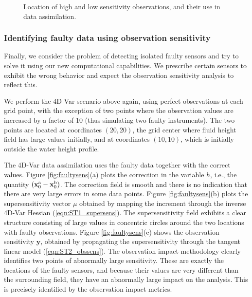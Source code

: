 \documentclass[final,sort&compress]{elsarticle}
\newcommand{\xb}{ \mathbf{x}^{\rm b} }
\newcommand{\xa}{ \mathbf{x}^{\rm a} }
\newcommand{\y}{ \mathbf{y} }
\begin{document}
\begin{figure}
\begin{center}
\setcounter{subfigure}{0}
\caption{Location of high and low sensitivity observations, and their use in data assimilation.}
\label{fig:OI_mask}
\end{center}
\end{figure}






\subsubsection{Identifying faulty data using observation sensitivity}

Finally, we consider the problem of detecting isolated faulty sensors and try to solve it using our new computational capabilities.
We prescribe certain sensors to exhibit the wrong behavior and expect the observation sensitivity analysis to reflect this.

We perform the 4D-Var scenario above again, using perfect observations at each grid point, with the exception of two points where
the observation values are increased by a factor of $10$ (thus simulating two faulty instruments). The two points are located at coordinates $(20,20)$, 
the grid center where fluid height field has large values initially, and at coordinates $(10,10)$, which is initially outside the water height profile.

The 4D-Var data assimilation uses the faulty data together with the correct values.
Figure \ref{fig:faultysens}(a) plots the correction in the variable $h$, i.e., the quantity $(\xa_0 - \xb_0)$.
The correction field is smooth and there is no indication that there are very large errors in some data points.
Figure \ref{fig:faultysens}(b) plots the supersensitivity vector $\mu$ obtained by mapping the increment through the inverse 4D-Var Hessian (\ref{eqn:ST1_supersens}).
The supersensitivity field exhibits a clear structure consisting of large values in concentric circles around the two locations with faulty observations.
Figure \ref{fig:faultysens}(c) shows the observation sensitivity $\y$, obtained by propagating the supersensitivity through the tangent linear model (\ref{eqn:ST2_obssens}).
The observation impact methodology clearly identifies two points of abnormally large sensitivity. 
These are exactly the locations of the faulty sensors, 
and because their values are very different than the surrounding field, they have an abnormally large impact on the analysis.
This is precisely identified by the observation impact metrics.
\end{document}
